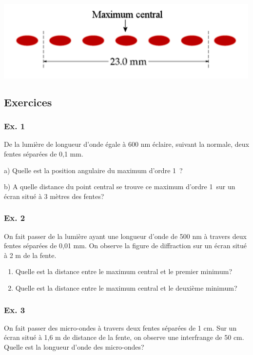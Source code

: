\includegraphics[width=13.259cm,height=4.045cm]{Pictures/100000010000059F000001B75001F99348A6D888.png}

\subsection{Exercices}

\subsubsection{Ex. 1}

De la lumière de longueur d'onde égale à 600 nm éclaire, suivant la
normale, deux fentes séparées de 0,1 mm.

a) Quelle est la position angulaire du maximum d'ordre 1~?

b) A quelle distance du point central se trouve ce maximum d'ordre 1~sur
un écran situé à 3 mètres des fentes?

\subsubsection{Ex. 2}
On fait passer de la lumière ayant une longueur d'onde de 500 nm à
travers deux fentes séparées de 0,01 mm. On observe la figure de
diffraction sur un écran situé à 2 m de la fente.

\begin{enumerate}
   \item Quelle est la distance entre le maximum central et le premier
minimum?
   \item Quelle est la distance entre le maximum central et le deuxième
minimum?
\end{enumerate}

\subsubsection{Ex. 3}

On fait passer des micro-ondes à travers deux fentes séparées de 1 cm.
Sur un écran situé à 1,6 m de distance de la fente, on observe une
interfrange de 50 cm. Quelle est la longueur d'onde des micro-ondes?

